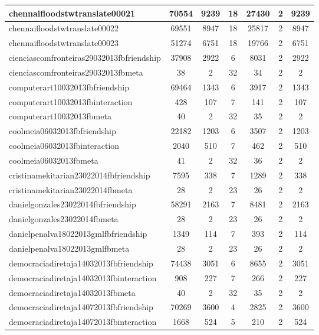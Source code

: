 \begin{table*}[h!]
\begin{center}
\begin{tabular}{| l | c | c | c | c | c | c |}
chennaifloodstwtranslate00021 & 70554  & 9239  & 18  & 27430  & 2  & 9239 \\\hline
chennaifloodstwtranslate00022 & 69551  & 8947  & 18  & 25817  & 2  & 8947 \\\hline
chennaifloodstwtranslate00023 & 51274  & 6751  & 18  & 19766  & 2  & 6751 \\\hline
cienciascomfronteiras29032013fbfriendship & 37908  & 2922  & 6  & 8031  & 2  & 2922 \\\hline
cienciascomfronteiras29032013fbmeta & 38  & 2  & 32  & 34  & 2  & 2 \\\hline
computerart10032013fbfriendship & 69464  & 1343  & 6  & 3917  & 2  & 1343 \\\hline
computerart10032013fbinteraction & 428  & 107  & 7  & 141  & 2  & 107 \\\hline
computerart10032013fbmeta & 40  & 2  & 32  & 35  & 2  & 2 \\\hline
coolmeia06032013fbfriendship & 22182  & 1203  & 6  & 3507  & 2  & 1203 \\\hline
coolmeia06032013fbinteraction & 2040  & 510  & 7  & 462  & 2  & 510 \\\hline
coolmeia06032013fbmeta & 41  & 2  & 32  & 36  & 2  & 2 \\\hline
cristinamekitarian23022014fbfriendship & 7595  & 338  & 7  & 1289  & 2  & 338 \\\hline
cristinamekitarian23022014fbmeta & 28  & 2  & 23  & 26  & 2  & 2 \\\hline
danielgonzales23022014fbfriendship & 58291  & 2163  & 7  & 8481  & 2  & 2163 \\\hline
danielgonzales23022014fbmeta & 28  & 2  & 23  & 26  & 2  & 2 \\\hline
danielpenalva18022013gmlfbfriendship & 1349  & 114  & 7  & 393  & 2  & 114 \\\hline
danielpenalva18022013gmlfbmeta & 28  & 2  & 23  & 26  & 2  & 2 \\\hline
democraciadiretaja14032013fbfriendship & 74438  & 3051  & 6  & 8655  & 2  & 3051 \\\hline
democraciadiretaja14032013fbinteraction & 908  & 227  & 7  & 266  & 2  & 227 \\\hline
democraciadiretaja14032013fbmeta & 40  & 2  & 32  & 35  & 2  & 2 \\\hline
democraciadiretaja14072013fbfriendship & 70269  & 3600  & 4  & 2825  & 2  & 3600 \\\hline
democraciadiretaja14072013fbinteraction & 1668  & 524  & 5  & 210  & 2  & 524 \\\hline

\end{tabular}
\end{center}
\end{table*}
